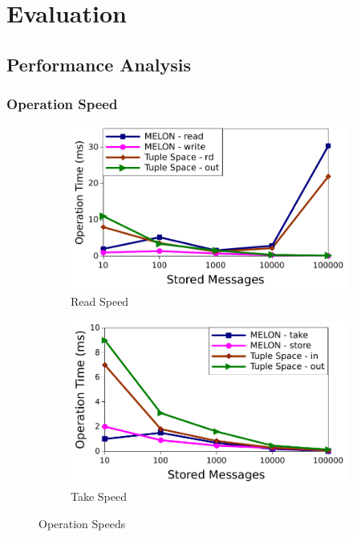 \chapter{Evaluation}

\section{Performance Analysis}

\subsection{Operation Speed}

\begin{figure}
\centering

\begin{subfigure}{.5\textwidth}
\centering
\includegraphics[width = \linewidth, clip, trim = 0px 0px 0px 0px]{figures/read_speed.pdf}
\caption{Read Speed}
\label{fig:readspeed}
\end{subfigure}%
\begin{subfigure}{.5\textwidth}
\centering
\includegraphics[width = \linewidth, clip, trim = 0px 0px 0px 0px]{figures/in_speed.pdf}
\caption{Take Speed}
\label{fig:takespeed}
\end{subfigure}

\caption{Operation Speeds}
\end{figure}

